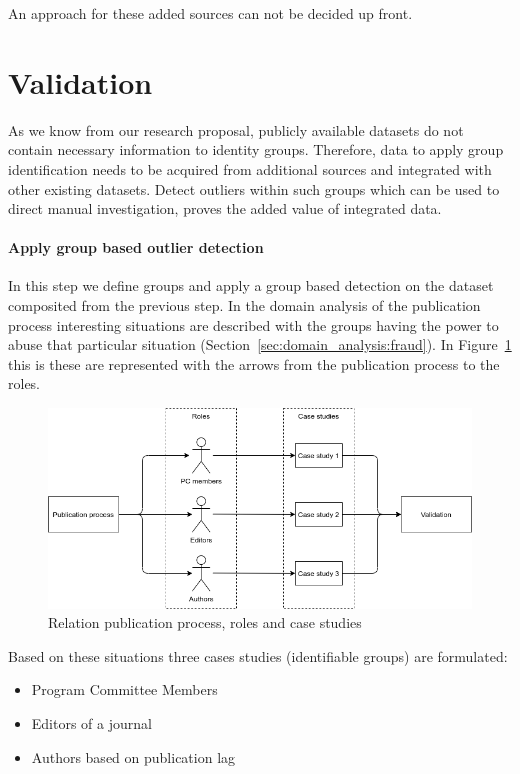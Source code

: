 \documentclass{ou-report}
\begin{document}
An approach for these added sources can not be decided up front.


\section{Validation}
As we know from our research proposal, publicly available datasets do not 
contain necessary information to identity groups. Therefore, data to apply 
group identification needs to be acquired from additional sources and 
integrated with other existing datasets. Detect outliers within such groups
which can be used to direct manual investigation, proves the added value of 
integrated data.

\paragraph{Apply group based outlier detection}
In this step we define groups and apply a group based detection on the dataset
composited from the previous step.
In the domain analysis of the 
publication process interesting situations are 
described with the groups having the power to abuse that particular situation
(Section~\ref{sec:domain_analysis:fraud}). In Figure~\ref{fig:research_method} this
is these are represented with the arrows from the publication process to the roles.

\begin{figure}[H]
\centering
\includegraphics[width=13cm]{images/research_method/research_method.png}
\caption{Relation publication process, roles and case studies}
\label{fig:research_method}
\end{figure}
Based on these situations three cases studies (identifiable groups) are formulated:
\begin{itemize}
    \item Program Committee Members
    \item Editors of a journal
    \item Authors based on publication lag
\end{itemize}
\end{document}
